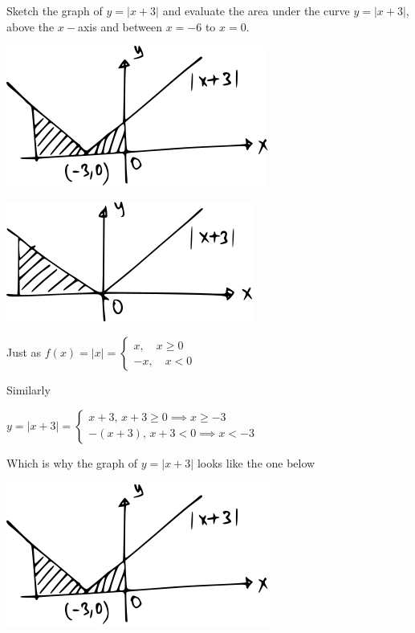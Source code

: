 \documentclass[14pt,fleqn]{extarticle}
\begin{document}
Sketch the graph of $y=\vert x + 3\vert$ and evaluate
the area under the curve $y=\vert x+3\vert$, above 
the $x-$axis and between $x=-6$ to $x=0$.
%

\newcard

\begin{center}
\includegraphics[scale=1.6]{img_prefab-1.svg} 
\end{center} 

\newcard

\begin{center}
\includegraphics[scale=1.6]{img_prefab-2.svg} 
\end{center} 

\newcard

Just as 
\small$ f(x) = \vert x\vert = \begin{cases} 
x,\quad x\geq 0 \\
-x,\quad x < 0 
\end{cases} $\normalsize \newline 

Similarly 

\small$y = \vert x+3\vert = \begin{cases}
x+3,\, x+3 \geq 0 \implies x \geq -3 \\
-\left(x+3 \right),\, x+3 < 0 \implies x < -3 
\end{cases}$ \normalsize\newline 

Which is why the graph of $y=\vert x+3\vert$ looks like the one below 

\begin{center}
\includegraphics[scale=1.6]{modx.svg} 
\end{center} 
\end{document}
